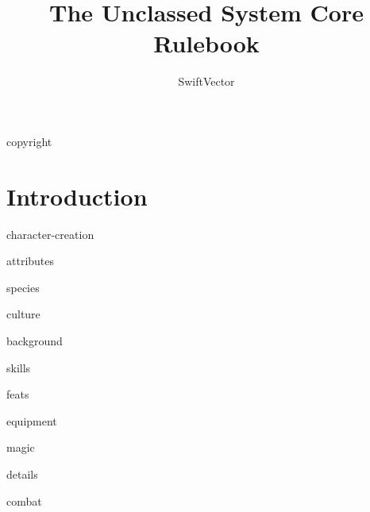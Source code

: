 \documentclass[8pt]{extbook}
\title{The Unclassed System Core Rulebook}
\author{SwiftVector}
\begin{document}
\maketitle

\frontmatter

{copyright}

\tableofcontents

\mainmatter
\chapter{Introduction}


{character-creation}

{attributes}

{species}

{culture}

{background}

{skills}

{feats}

{equipment}

{magic}

{details}

{combat}


\backmatter

\printindex

\glsaddallunused
\printglossary[type=\acronymtype]
\printglossary
\end{document}
